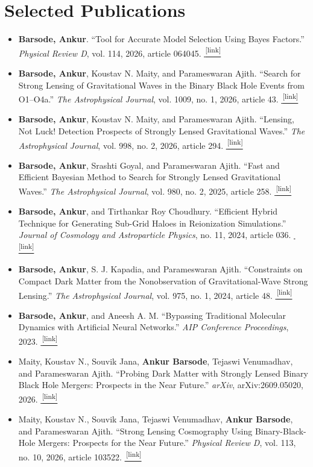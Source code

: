 \documentclass[a4paper,11pt]{article}
\newif\iffullpublications
\newcommand{\publication}[2]{\item[--] #1\href{#2}{\,\textsuperscript{[link]}}}
\newcommand{\myname}{\textbf{Barsode, Ankur}}
\newcommand{\myfullname}{\textbf{Ankur Barsode}}
\begin{document}
\section{\iffullpublications Publications\else Selected Publications\fi}
\begin{itemize}[nosep,after=\strut,leftmargin=1em,itemsep=3pt]
\iffullpublications
\publication{\myname. ``Tool for Accurate Model Selection Using Bayes Factors.'' \textit{Physical Review D}, vol. 114, 2026, article 064045. }{https://doi.org/10.1103/wv11-h53b}
\publication{\myname, Koustav N. Maity, and Parameswaran Ajith. ``Search for Strong Lensing of Gravitational Waves in the Binary Black Hole Events from O1--O4a.'' \textit{The Astrophysical Journal}, vol. 1009, no. 1, 2026, article 43. }{https://doi.org/10.3847/1538-4357/ae9d69}
\publication{\myname, Koustav N. Maity, and Parameswaran Ajith. ``Lensing, Not Luck! Detection Prospects of Strongly Lensed Gravitational Waves.'' \textit{The Astrophysical Journal}, vol. 998, no. 2, 2026, article 294. }{https://doi.org/10.3847/1538-4357/ae38c1}
\publication{\myname, Srashti Goyal, and Parameswaran Ajith. ``Fast and Efficient Bayesian Method to Search for Strongly Lensed Gravitational Waves.'' \textit{The Astrophysical Journal}, vol. 980, no. 2, 2025, article 258. }{https://doi.org/10.3847/1538-4357/adae10}
\publication{\myname, and Tirthankar Roy Choudhury. ``Efficient Hybrid Technique for Generating Sub-Grid Haloes in Reionization Simulations.'' \textit{Journal of Cosmology and Astroparticle Physics}, no. 11, 2024, article 036. }{https://doi.org/10.1088/1475-7516/2024/11/036}
\publication{\myname, S. J. Kapadia, and Parameswaran Ajith. ``Constraints on Compact Dark Matter from the Nonobservation of Gravitational-Wave Strong Lensing.'' \textit{The Astrophysical Journal}, vol. 975, no. 1, 2024, article 48. }{https://doi.org/10.3847/1538-4357/ad77c4}
\publication{\myname, and Aneesh A. M. ``Bypassing Traditional Molecular Dynamics with Artificial Neural Networks.'' \textit{AIP Conference Proceedings}, 2023. }{https://doi.org/10.1063/5.0127801}
\publication{Maity, Koustav N., Souvik Jana, \myfullname, Tejaswi Venumadhav, and Parameswaran Ajith. ``Probing Dark Matter with Strongly Lensed Binary Black Hole Mergers: Prospects in the Near Future.'' \textit{arXiv}, arXiv:2609.05020, 2026. }{https://arxiv.org/abs/2609.05020}
\publication{Maity, Koustav N., Souvik Jana, Tejaswi Venumadhav, \myfullname, and Parameswaran Ajith. ``Strong Lensing Cosmography Using Binary-Black-Hole Mergers: Prospects for the Near Future.'' \textit{Physical Review D}, vol. 113, no. 10, 2026, article 103522. }{https://doi.org/10.1103/xq61-pqm6}

\end{itemize}
\end{document}
